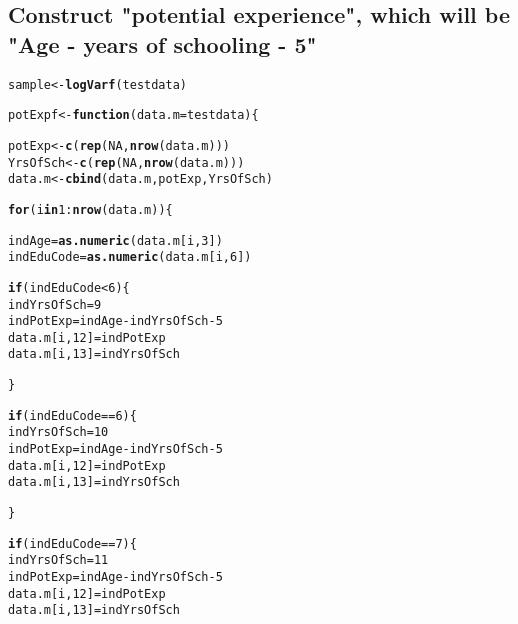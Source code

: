 \documentclass{article}\usepackage[]{graphicx}\usepackage[]{color}
\makeatletter
\newcommand{\hlnum}[1]{\textcolor[rgb]{0.686,0.059,0.569}{#1}}%
\newcommand{\hlopt}[1]{\textcolor[rgb]{0,0,0}{#1}}%
\newcommand{\hlstd}[1]{\textcolor[rgb]{0.345,0.345,0.345}{#1}}%
\newcommand{\hlkwa}[1]{\textcolor[rgb]{0.161,0.373,0.58}{\textbf{#1}}}%
\newcommand{\hlkwb}[1]{\textcolor[rgb]{0.69,0.353,0.396}{#1}}%
\newcommand{\hlkwc}[1]{\textcolor[rgb]{0.333,0.667,0.333}{#1}}%
\newcommand{\hlkwd}[1]{\textcolor[rgb]{0.737,0.353,0.396}{\textbf{#1}}}%
\newenvironment{kframe}{%
 \def\at@end@of@kframe{}%
 \ifinner\ifhmode%
  \def\at@end@of@kframe{\end{minipage}}%
  \begin{minipage}{\columnwidth}%
 \fi\fi%
 \def\FrameCommand##1{\hskip\@totalleftmargin \hskip-\fboxsep
 \colorbox{shadecolor}{##1}\hskip-\fboxsep
     \hskip-\linewidth \hskip-\@totalleftmargin \hskip\columnwidth}%
 \MakeFramed {\advance\hsize-\width
   \@totalleftmargin\z@ \linewidth\hsize
   \@setminipage}}%
 {\par\unskip\endMakeFramed%
 \at@end@of@kframe}
\newenvironment{knitrout}{}{} %
\makeatother
\begin{document}
\subsection{Construct "potential experience", which will be "Age - years of schooling - 5"}

\begin{knitrout}
\color{fgcolor}\begin{kframe}
\begin{alltt}
\hlstd{sample} \hlkwb{<-} \hlkwd{logVarf}\hlstd{(testdata)}

\hlstd{potExpf} \hlkwb{<-} \hlkwa{function}\hlstd{(}\hlkwc{data.m} \hlstd{= testdata)\{}

  \hlstd{potExp} \hlkwb{<-} \hlkwd{c}\hlstd{(}\hlkwd{rep}\hlstd{(}\hlnum{NA}\hlstd{,} \hlkwd{nrow}\hlstd{(data.m)))}
  \hlstd{YrsOfSch} \hlkwb{<-} \hlkwd{c}\hlstd{(}\hlkwd{rep}\hlstd{(}\hlnum{NA}\hlstd{,} \hlkwd{nrow}\hlstd{(data.m)))}
  \hlstd{data.m} \hlkwb{<-} \hlkwd{cbind}\hlstd{(data.m, potExp, YrsOfSch)}

  \hlkwa{for} \hlstd{(i} \hlkwa{in} \hlnum{1}\hlopt{:}\hlkwd{nrow}\hlstd{(data.m))\{}

    \hlstd{indAge} \hlkwb{=} \hlkwd{as.numeric}\hlstd{(data.m[i,}\hlnum{3}\hlstd{])}
    \hlstd{indEduCode} \hlkwb{=} \hlkwd{as.numeric}\hlstd{(data.m[i,}\hlnum{6}\hlstd{])}

    \hlkwa{if} \hlstd{(indEduCode} \hlopt{<} \hlnum{6}\hlstd{)\{}
      \hlstd{indYrsOfSch} \hlkwb{=} \hlnum{9}
      \hlstd{indPotExp} \hlkwb{=} \hlstd{indAge} \hlopt{-} \hlstd{indYrsOfSch} \hlopt{-} \hlnum{5}
      \hlstd{data.m[i,}\hlnum{12}\hlstd{]} \hlkwb{=} \hlstd{indPotExp}
      \hlstd{data.m[i,}\hlnum{13}\hlstd{]} \hlkwb{=} \hlstd{indYrsOfSch}

    \hlstd{\}}

    \hlkwa{if} \hlstd{(indEduCode} \hlopt{==} \hlnum{6}\hlstd{)\{}
      \hlstd{indYrsOfSch} \hlkwb{=} \hlnum{10}
      \hlstd{indPotExp} \hlkwb{=} \hlstd{indAge} \hlopt{-} \hlstd{indYrsOfSch} \hlopt{-} \hlnum{5}
      \hlstd{data.m[i,}\hlnum{12}\hlstd{]} \hlkwb{=} \hlstd{indPotExp}
      \hlstd{data.m[i,}\hlnum{13}\hlstd{]} \hlkwb{=} \hlstd{indYrsOfSch}

    \hlstd{\}}

    \hlkwa{if} \hlstd{(indEduCode} \hlopt{==} \hlnum{7}\hlstd{)\{}
      \hlstd{indYrsOfSch} \hlkwb{=} \hlnum{11}
      \hlstd{indPotExp} \hlkwb{=} \hlstd{indAge} \hlopt{-} \hlstd{indYrsOfSch} \hlopt{-} \hlnum{5}
      \hlstd{data.m[i,}\hlnum{12}\hlstd{]} \hlkwb{=} \hlstd{indPotExp}
      \hlstd{data.m[i,}\hlnum{13}\hlstd{]} \hlkwb{=} \hlstd{indYrsOfSch}


\end{alltt}
\end{kframe}
\end{knitrout}
\end{document}
